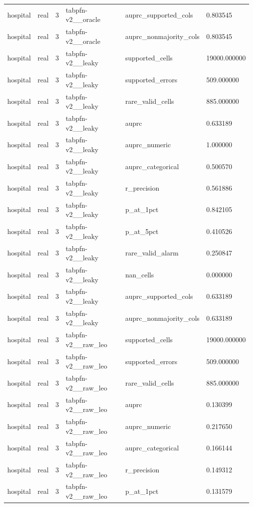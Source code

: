 \begin{tabular}{llllll}
hospital & real & 3 & tabpfn-v2\_\_oracle & auprc\_supported\_cols & 0.803545 \\
hospital & real & 3 & tabpfn-v2\_\_oracle & auprc\_nonmajority\_cols & 0.803545 \\
hospital & real & 3 & tabpfn-v2\_\_leaky & supported\_cells & 19000.000000 \\
hospital & real & 3 & tabpfn-v2\_\_leaky & supported\_errors & 509.000000 \\
hospital & real & 3 & tabpfn-v2\_\_leaky & rare\_valid\_cells & 885.000000 \\
hospital & real & 3 & tabpfn-v2\_\_leaky & auprc & 0.633189 \\
hospital & real & 3 & tabpfn-v2\_\_leaky & auprc\_numeric & 1.000000 \\
hospital & real & 3 & tabpfn-v2\_\_leaky & auprc\_categorical & 0.500570 \\
hospital & real & 3 & tabpfn-v2\_\_leaky & r\_precision & 0.561886 \\
hospital & real & 3 & tabpfn-v2\_\_leaky & p\_at\_1pct & 0.842105 \\
hospital & real & 3 & tabpfn-v2\_\_leaky & p\_at\_5pct & 0.410526 \\
hospital & real & 3 & tabpfn-v2\_\_leaky & rare\_valid\_alarm & 0.250847 \\
hospital & real & 3 & tabpfn-v2\_\_leaky & nan\_cells & 0.000000 \\
hospital & real & 3 & tabpfn-v2\_\_leaky & auprc\_supported\_cols & 0.633189 \\
hospital & real & 3 & tabpfn-v2\_\_leaky & auprc\_nonmajority\_cols & 0.633189 \\
hospital & real & 3 & tabpfn-v2\_\_raw\_leo & supported\_cells & 19000.000000 \\
hospital & real & 3 & tabpfn-v2\_\_raw\_leo & supported\_errors & 509.000000 \\
hospital & real & 3 & tabpfn-v2\_\_raw\_leo & rare\_valid\_cells & 885.000000 \\
hospital & real & 3 & tabpfn-v2\_\_raw\_leo & auprc & 0.130399 \\
hospital & real & 3 & tabpfn-v2\_\_raw\_leo & auprc\_numeric & 0.217650 \\
hospital & real & 3 & tabpfn-v2\_\_raw\_leo & auprc\_categorical & 0.166144 \\
hospital & real & 3 & tabpfn-v2\_\_raw\_leo & r\_precision & 0.149312 \\
hospital & real & 3 & tabpfn-v2\_\_raw\_leo & p\_at\_1pct & 0.131579 \\

\end{tabular}
